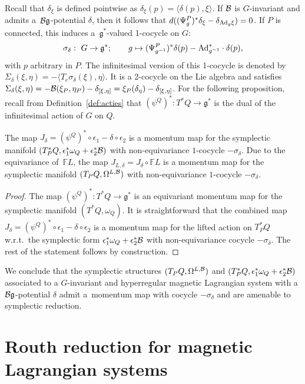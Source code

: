 \documentclass[pdftex]{sigma}
\newcommand{\B}{{\cal B}}
\newcommand{\e}{\epsilon}
\newcommand{\lag}{\mathfrak{g}}
\newcommand{\F}{\mathbb{F}}
\newcommand{\ractie}{\psi}
\begin{document}
Recall that $\delta_\xi$ is def\/ined pointwise as $\delta_\xi(p) = \langle \delta(p),\xi\rangle$. If $\B$ is $G$-invariant and admits a~$\B\lag$-potential $\delta$, then it follows that $d((\Psi^P_g)^* \delta_\xi - \delta_{{\rm Ad}_g\xi})=0$. If $P$ is connected, this induces a~$\lag^*$-valued 1-cocycle on $G$:
\[
\sigma_\delta: \ G\to \lag^{*}; \qquad g \mapsto (\Psi^{P}_{g^{-1}})^{*}\delta(p) - {\rm Ad}^{*}_{g^{-1}}\cdot \delta(p),
\]
with $p$ arbitrary in $P$. The inf\/initesimal version of this 1-cocycle is denoted by $\Sigma_\delta(\xi,\eta)=-\langle T_e\sigma_\delta(\xi),\eta\rangle$. It is a 2-cocycle on the Lie algebra and satisf\/ies  $\Sigma_\delta(\xi,\eta)= -\B(\xi_{P},\eta_{P})-\delta_{[\xi,\eta]} = \xi_P(\delta_\eta)-\delta_{[\xi,\eta]}$. For the following proposition, recall from Def\/inition~\ref{def:acties} that $(\ractie^Q)^*: T^*Q \to \lag^*$ is the dual of the inf\/initesimal action of $G$ on $Q$.

\begin{proposition}\label{prop:equiv} The map $J_\delta=(\ractie^Q)^*\circ\e_{1}-\delta\circ\e_{2}$ is a momentum map for the symplectic manifold $(T_P^*Q,\e^*_1\omega_Q +\e^*_2 \B)$ with non-equivariance $1$-cocycle $-\sigma_\delta$. Due to the equivariance of~$\F L$, the map $J_{L,\delta}= J_\delta\circ \F L$ is a momentum map for the symplectic manifold $(T_PQ,\Omega^{L,\B})$ with non-equivariance $1$-cocycle $-\sigma_\delta$. \end{proposition}
\begin{proof}
The map $(\ractie^Q)^*: T^*Q\to \lag^*$ is an equivariant momentum map for the symplectic manifold $(T^*Q,\omega_Q)$. It is straightforward that the combined map $J_\delta=(\ractie^Q)^*\circ\e_{1}-\delta\circ\e_{2}$ is a momentum map for the lifted action on $T^{*}_{P}Q$ w.r.t.\ the symplectic form $\e_{1}^{*}\omega_{Q} + \e_{2}^{*}\B$ with non-equivariance cocycle $-\sigma_\delta$. The rest of the statement follows by construction.
\end{proof}

We conclude that the symplectic structures $(T_PQ,\Omega^{L,\B})$ and $(T_P^*Q,\e^*_1\omega_Q +\e^*_2 \B)$ associated to a $G$-invariant and hyperregular magnetic Lagrangian system with a $\B\lag$-potential $\delta$ admit a~momentum map with cocycle $-\sigma_\delta$ and are amenable to symplectic reduction.

\section{Routh reduction for magnetic Lagrangian systems}\label{section5}
\end{document}
